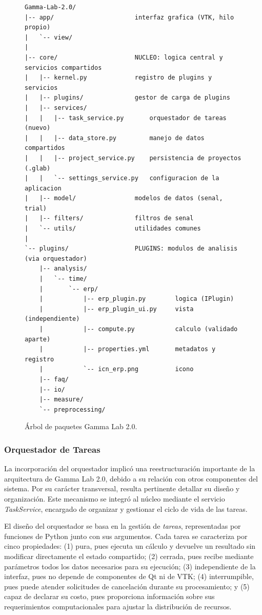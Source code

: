 \documentclass[12pt,letterpaper,oneside]{article}
\begin{document}
\begin{figure}[H]
\centering
\begin{lstlisting}
Gamma-Lab-2.0/
|-- app/                      interfaz grafica (VTK, hilo propio)
|   `-- view/
|
|-- core/                     NUCLEO: logica central y servicios compartidos
|   |-- kernel.py             registro de plugins y servicios
|   |-- plugins/              gestor de carga de plugins
|   |-- services/
|   |   |-- task_service.py       orquestador de tareas (nuevo)
|   |   |-- data_store.py         manejo de datos compartidos
|   |   |-- project_service.py    persistencia de proyectos (.glab)
|   |   `-- settings_service.py   configuracion de la aplicacion
|   |-- model/                modelos de datos (senal, trial)
|   |-- filters/              filtros de senal
|   `-- utils/                utilidades comunes
|
`-- plugins/                  PLUGINS: modulos de analisis (via orquestador)
    |-- analysis/
    |   `-- time/
    |       `-- erp/
    |           |-- erp_plugin.py        logica (IPlugin)
    |           |-- erp_plugin_ui.py     vista (independiente)
    |           |-- compute.py           calculo (validado aparte)
    |           |-- properties.yml       metadatos y registro
    |           `-- icn_erp.png          icono
    |-- faq/
    |-- io/
    |-- measure/
    `-- preprocessing/
\end{lstlisting}
\caption{Árbol de paquetes Gamma Lab 2.0. }
\label{fig:estructura-archivos}
\end{figure}

\subsubsection{Orquestador de Tareas}

La incorporación del orquestador implicó una reestructuración importante de la arquitectura de Gamma Lab 2.0, debido a su relación con otros componentes del sistema. Por su carácter transversal, resulta pertinente detallar su diseño y organización. Este mecanismo se integró al núcleo mediante el servicio \textit{TaskService}, encargado de organizar y gestionar el ciclo de vida de las tareas.

El diseño del orquestador se basa en la gestión de \textit{tareas}, representadas por funciones de Python junto con sus argumentos. Cada tarea se caracteriza por cinco propiedades: (1) pura, pues ejecuta un cálculo y devuelve un resultado sin modificar directamente el estado compartido; (2) cerrada, pues recibe mediante parámetros todos los datos necesarios para su ejecución; (3) independiente de la interfaz, pues no depende de componentes de Qt ni de VTK; (4) interrumpible, pues puede atender solicitudes de cancelación durante su procesamiento; y (5) capaz de declarar su costo, pues proporciona información sobre sus requerimientos computacionales para ajustar la distribución de recursos.
\end{document}
